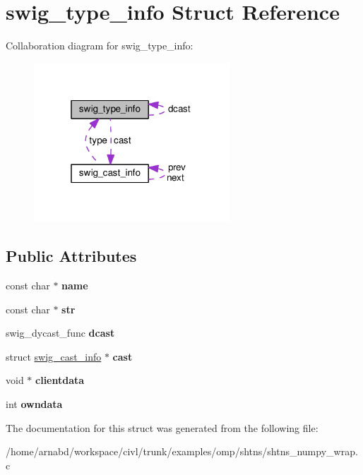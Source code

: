 \hypertarget{structswig__type__info}{}\section{swig\+\_\+type\+\_\+info Struct Reference}
\label{structswig__type__info}


Collaboration diagram for swig\+\_\+type\+\_\+info\+:
\nopagebreak
\begin{figure}[H]
\begin{center}
\leavevmode
\includegraphics[width=208pt]{structswig__type__info__coll__graph}
\end{center}
\end{figure}
\subsection*{Public Attributes}
\begin{DoxyCompactItemize}
\item 
\hypertarget{structswig__type__info_a90a9c6a25aa3e923978005ecbe23ad60}{}const char $\ast$ {\bfseries name}\label{structswig__type__info_a90a9c6a25aa3e923978005ecbe23ad60}

\item 
\hypertarget{structswig__type__info_abbe7cc58a083feb4329b748643324064}{}const char $\ast$ {\bfseries str}\label{structswig__type__info_abbe7cc58a083feb4329b748643324064}

\item 
\hypertarget{structswig__type__info_a07df4bedf85be77b23756b531b60e0dd}{}swig\+\_\+dycast\+\_\+func {\bfseries dcast}\label{structswig__type__info_a07df4bedf85be77b23756b531b60e0dd}

\item 
\hypertarget{structswig__type__info_a3ee3f7ef20e965b6c798d79723a96f9b}{}struct \hyperlink{structswig__cast__info}{swig\+\_\+cast\+\_\+info} $\ast$ {\bfseries cast}\label{structswig__type__info_a3ee3f7ef20e965b6c798d79723a96f9b}

\item 
\hypertarget{structswig__type__info_a19bdd65dceb89cd54befd3ded06558b7}{}void $\ast$ {\bfseries clientdata}\label{structswig__type__info_a19bdd65dceb89cd54befd3ded06558b7}

\item 
\hypertarget{structswig__type__info_a93c25d5903cbfcb82208eea7227c32bd}{}int {\bfseries owndata}\label{structswig__type__info_a93c25d5903cbfcb82208eea7227c32bd}

\end{DoxyCompactItemize}


The documentation for this struct was generated from the following file\+:\begin{DoxyCompactItemize}
\item 
/home/arnabd/workspace/civl/trunk/examples/omp/shtns/shtns\+\_\+numpy\+\_\+wrap.\+c\end{DoxyCompactItemize}
